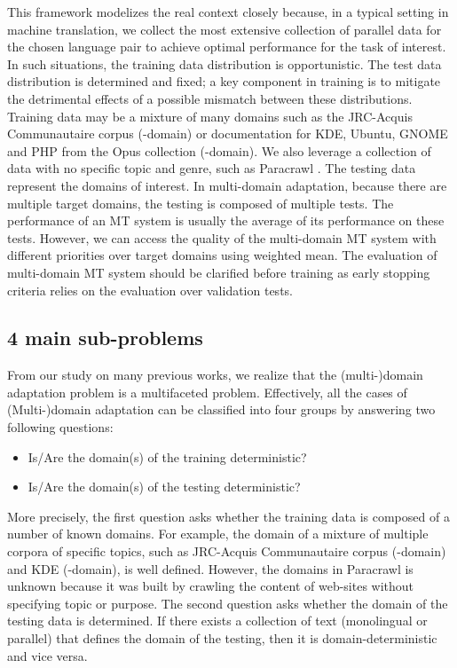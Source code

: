 This framework modelizes the real context closely because, in a typical setting in machine translation, we collect the most extensive collection of parallel data for the chosen language pair to achieve optimal performance for the task of interest. In such situations, the training data distribution is opportunistic. The test data distribution is determined and fixed; a key component in training is to mitigate the detrimental effects of a possible mismatch between these distributions. Training data may be a mixture of many domains such as the JRC-Acquis Communautaire corpus (-domain) \citep{Steinberger06acquis} or documentation for KDE, Ubuntu, GNOME and PHP from the Opus collection \citep{Tiedemann09news} (-domain). We also leverage a collection of data with no specific topic and genre, such as Paracrawl \citep{Banon20Paracrawl}. The testing data represent the domains of interest. In multi-domain adaptation, because there are multiple target domains, the testing is composed of multiple tests. The performance of an MT system is usually the average of its performance on these tests. However, we can access the quality of the multi-domain MT system with different priorities over target domains using weighted mean. The evaluation of multi-domain MT system should be clarified before training as early stopping criteria relies on the evaluation over validation tests.
\subsection{4 main sub-problems}
From our study on many previous works, we realize that the (multi-)domain adaptation problem is a multifaceted problem. Effectively, all the cases of (Multi-)domain adaptation can be classified into four groups by answering two following questions:
\begin{itemize}
	\item Is/Are the domain(s) of the training deterministic?
	\item Is/Are the domain(s) of the testing deterministic?
\end{itemize}
More precisely, the first question asks whether the training data is composed of a number of known domains. For example, the domain of a mixture of multiple corpora of specific topics, such as JRC-Acquis Communautaire corpus (-domain) and KDE (-domain), is well defined. However, the domains in Paracrawl \citep{Banon20Paracrawl} is unknown because it was built by crawling the content of web-sites without specifying topic or purpose. The second question asks whether the domain of the testing data is determined. If there exists a collection of text (monolingual or parallel) that defines the domain of the testing, then it is domain-deterministic and vice versa. 

